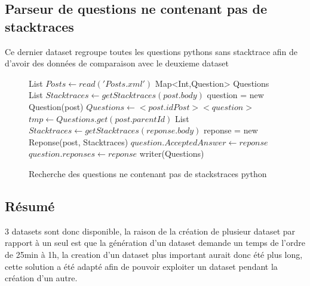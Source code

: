 \subsection{Parseur de questions ne contenant pas de stacktraces}
Ce dernier dataset regroupe toutes les questions pythons sans stacktrace afin de d'avoir des données de comparaison avec le deuxieme dataset
\begin{figure}[!h]
\begin{center}
\begin{algorithmic}
	\State List $Posts \gets read('Posts.xml')$
	\State Map<Int,Question> Questions
			\State List $Stacktraces \gets getStacktraces(post.body)$
				\State question = new Question(post)
				\State $Questions \gets <post.idPost><question>$
			\EndIf
		\Else {}
			\State $tmp\gets Questions.get(post.parentId)$
				\State List $Stacktraces \gets getStacktraces(reponse.body)$
				\State reponse = new Reponse(post, Stacktraces)
					\State $question.AcceptedAnswer \gets reponse$
				\Else
					\State $question.reponses \gets reponse$
				\EndIf
			\EndIf
		\EndIf
		\EndIf
	\EndFor
	\State writer(Questions)
\EndFunction
\end{algorithmic}
\caption{Recherche des questions ne contenant pas de stackstraces python}
\label{Recherche des questions ne contenant pas de stackstraces python}
\end{center}
\end{figure}
\subsection{Résumé}
3 datasets sont donc disponible, la raison de la création de plusieur dataset par rapport à un seul est que la génération d'un dataset demande un temps de l'ordre de 25min à 1h, la creation d'un dataset plus important aurait donc été plus long, cette solution a été adapté afin de pouvoir exploiter un dataset pendant la création d'un autre.
